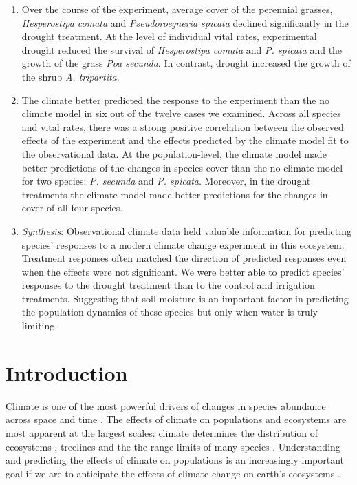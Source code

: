 \documentclass[11pt]{article}
\begin{document}
\begin{doublespacing}
\begin{enumerate}
\item Over the course of the experiment, average cover of the perennial grasses, \textit{Hesperostipa comata} and \textit{Pseudoroegneria spicata} declined significantly in the drought treatment. At the level of individual vital rates, experimental drought reduced the survival of \textit{Hesperostipa comata} and \textit{P. spicata}  and the growth of the grass \textit{Poa secunda}. In contrast, drought increased the growth of the shrub \textit{A. tripartita}. 
\item The climate better predicted the response to the experiment than the no climate model in six out of the twelve cases we examined. Across all species and vital rates, there was a strong positive correlation between the observed effects of the experiment and the effects predicted by the climate model fit to the observational data. At the population-level, the climate model made better predictions of the changes in species cover than the no climate model for two species: \textit{P. secunda} and \textit{P. spicata}. Moreover, in the drought treatments the climate model made better predictions for the changes in cover of all four species. 
\item \emph{Synthesis}: Observational climate data held valuable information for predicting species' responses to a modern climate change experiment in this ecosystem. Treatment responses often matched the direction of predicted responses even when the effects were not significant. We were better able to predict species' responses to the drought treatment than to the control and irrigation treatments. Suggesting that soil moisture is an important factor in predicting the population dynamics of these species but only when water is truly limiting.
  

\end{enumerate}


\section*{Introduction}

Climate is one of the most powerful drivers of changes in species abundance across space and time \citep{post_synchronization_2002,davis_range_2001,walther_ecological_2002}. The effects of climate on populations and ecosystems are most apparent at the largest scales: climate determines the distribution of ecosystems \citep{whittaker_communities_1975}, treelines \citep{korner_alpine_2012} and the the range limits of many species \citep{parmesan_globally_2003,davis_range_2001}. Understanding and predicting the effects of climate on populations is an increasingly important goal if we are to anticipate the effects of climate change on earth's ecosystems \citep{tredennick_we_2016,petchey_ecological_2015,ehrlen_advancing_2016,teller_linking_2016}.
 

\end{doublespacing}
\end{document}
